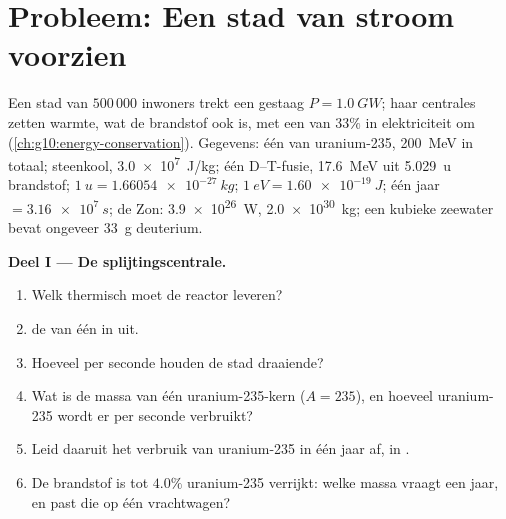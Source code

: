 \section{Probleem: Een stad van stroom voorzien}

\begin{problem}
\label{pb:g12:nuclear-energy:1}
Een stad van $500\,000$ inwoners trekt een gestaag 
$P = \qty{1.0}{GW}$; haar centrales zetten warmte, wat de brandstof ook is, met
een  van $33\%$ in elektriciteit om
(\cref{ch:g10:energy-conservation}). Gegevens: één  van
uranium-235, \qty{200}{MeV} in totaal; steenkool, \qty{3.0e7}{J/kg}; één
D--T-fusie, \qty{17.6}{MeV} uit \qty{5.029}{u} brandstof;
$\qty{1}{u} = \qty{1.66054e-27}{kg}$; $\qty{1}{eV} = \qty{1.60e-19}{J}$; één
jaar $= \qty{3.16e7}{s}$; de Zon: \qty{3.9e26}{W}, \qty{2.0e30}{kg}; een
kubieke  zeewater bevat ongeveer \qty{33}{g} deuterium.

\medskip
\noindent\textbf{Deel I --- De splijtingscentrale.}
\begin{enumerate}
  \item Welk thermisch  moet de reactor leveren?
  \item {} de  van één  in  uit.
  \item Hoeveel  per seconde houden de stad draaiende?
  \item Wat is de massa van één uranium-235-kern ($A = 235$), en hoeveel
        uranium-235 wordt er per seconde verbruikt?
  \item Leid daaruit het verbruik van uranium-235 in één jaar af, in .
  \item De brandstof is tot $4.0\%$ uranium-235 verrijkt: welke massa vraagt
        een jaar, en past die op één vrachtwagen?
\end{enumerate}


\end{problem}
